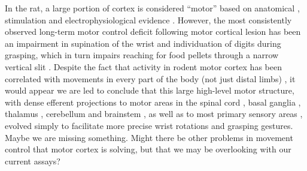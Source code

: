 In the rat, a large portion of cortex is considered ``motor'' based on anatomical \cite{Donoghue1982}, stimulation \cite{Donoghue1982,Neafsey1986} and electrophysiological evidence \cite{Hyland1998}. However, the most consistently observed long-term motor control deficit following motor cortical lesion has been an impairment in supination of the wrist and individuation of digits during grasping, which in turn impairs reaching for food pellets through a narrow vertical slit \cite{Whishaw1991,Alaverdashvili2008a}. Despite the fact that activity in rodent motor cortex has been correlated with movements in every part of the body (not just distal limbs) \cite{Hill2011,Erlich2011}, it would appear we are led to conclude that this large high-level motor structure, with dense efferent projections to motor areas in the spinal cord \cite{Kuypers1981}, basal ganglia \cite{Turner2000,Wu2009}, thalamus \cite{Lee2008}, cerebellum \cite{Baker2001} and brainstem \cite{Jarratt1999}, as well as to most primary sensory areas \cite{Petreanu2012,Schneider2014}, evolved simply to facilitate more precise wrist rotations and grasping gestures. Maybe we are missing something. Might there be other problems in movement control that motor cortex is solving, but that we may be overlooking with our current assays?

